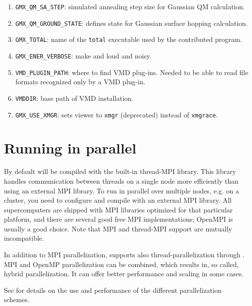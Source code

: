\begin{enumerate}
\item   {\tt GMX_QM_SA_STEP}: simulated annealing step size for Gaussian QM calculation.
\item   {\tt GMX_QM_GROUND_STATE}: defines state for Gaussian surface hopping calculation.
\item   {\tt GMX_TOTAL}: name of the {\tt total} executable used by the contributed
        {\tt {}} program.
\item   {\tt GMX_ENER_VERBOSE}: make {\tt {}} and {\tt {}}
        loud and noisy.
\item   {\tt VMD_PLUGIN_PATH}: where to find VMD plug-ins. Needed to be
        able to read file formats recognized only by a VMD plug-in.
\item   {\tt VMDDIR}: base path of VMD installation.
\item   {\tt GMX_USE_XMGR}: sets viewer to {\tt xmgr} (deprecated) instead of {\tt xmgrace}.

\end{enumerate}

\section{Running {\gromacs} in parallel}
By default {\gromacs} will be compiled with the built-in thread-MPI library.
This library handles communication between threads on a single
node more efficiently than using an external MPI library.
To run {\gromacs} in parallel over multiple nodes, e.g. on a cluster,
you need to configure and compile {\gromacs} with an external
MPI library. All supercomputers are shipped with MPI libraries optimized for 
that particular platform, and there are several good free MPI
implementations; OpenMPI is usually a good choice.
Note that MPI and thread-MPI support are mutually incompatible.

In addition to MPI parallelization, {\gromacs} supports also
thread-parallelization through . MPI and OpenMP parallelization
can be combined, which results in, so called, hybrid parallelization. It can offer
better performance and scaling in some cases.

See {\wwwpage} for details on the use and performance of the different
parallelization schemes.

